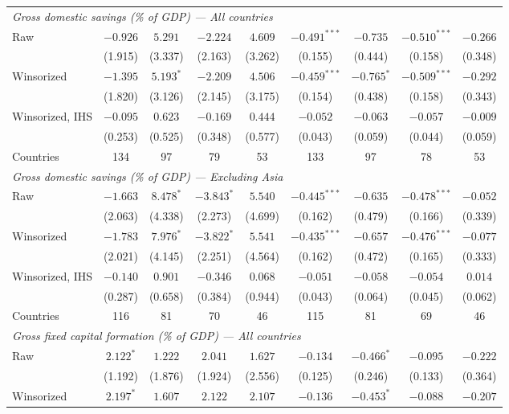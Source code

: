\begin{table}[htbp]
{\begin{tabular}{lcccccccc}
\midrule
\multicolumn{9}{l}{\textit{Gross domestic savings (\% of GDP) --- All countries}} \\
Raw & $-0.926$ & $5.291$ & $-2.224$ & $4.609$ & $-0.491^{***}$ & $-0.735$ & $-0.510^{***}$ & $-0.266$ \\
 & (1.915) & (3.337) & (2.163) & (3.262) & (0.155) & (0.444) & (0.158) & (0.348) \\
Winsorized & $-1.395$ & $5.193^{*}$ & $-2.209$ & $4.506$ & $-0.459^{***}$ & $-0.765^{*}$ & $-0.509^{***}$ & $-0.292$ \\
 & (1.820) & (3.126) & (2.145) & (3.175) & (0.154) & (0.438) & (0.158) & (0.343) \\
Winsorized, IHS & $-0.095$ & $0.623$ & $-0.169$ & $0.444$ & $-0.052$ & $-0.063$ & $-0.057$ & $-0.009$ \\
 & (0.253) & (0.525) & (0.348) & (0.577) & (0.043) & (0.059) & (0.044) & (0.059) \\
Countries & 134 & 97 & 79 & 53 & 133 & 97 & 78 & 53 \\
\midrule
\multicolumn{9}{l}{\textit{Gross domestic savings (\% of GDP) --- Excluding Asia}} \\
Raw & $-1.663$ & $8.478^{*}$ & $-3.843^{*}$ & $5.540$ & $-0.445^{***}$ & $-0.635$ & $-0.478^{***}$ & $-0.052$ \\
 & (2.063) & (4.338) & (2.273) & (4.699) & (0.162) & (0.479) & (0.166) & (0.339) \\
Winsorized & $-1.783$ & $7.976^{*}$ & $-3.822^{*}$ & $5.541$ & $-0.435^{***}$ & $-0.657$ & $-0.476^{***}$ & $-0.077$ \\
 & (2.021) & (4.145) & (2.251) & (4.564) & (0.162) & (0.472) & (0.165) & (0.333) \\
Winsorized, IHS & $-0.140$ & $0.901$ & $-0.346$ & $0.068$ & $-0.051$ & $-0.058$ & $-0.054$ & $0.014$ \\
 & (0.287) & (0.658) & (0.384) & (0.944) & (0.043) & (0.064) & (0.045) & (0.062) \\
Countries & 116 & 81 & 70 & 46 & 115 & 81 & 69 & 46 \\
\midrule
\multicolumn{9}{l}{\textit{Gross fixed capital formation (\% of GDP) --- All countries}} \\
Raw & $2.122^{*}$ & $1.222$ & $2.041$ & $1.627$ & $-0.134$ & $-0.466^{*}$ & $-0.095$ & $-0.222$ \\
 & (1.192) & (1.876) & (1.924) & (2.556) & (0.125) & (0.246) & (0.133) & (0.364) \\
Winsorized & $2.197^{*}$ & $1.607$ & $2.122$ & $2.107$ & $-0.136$ & $-0.453^{*}$ & $-0.088$ & $-0.207$ \\

\end{tabular}}
\end{table}
